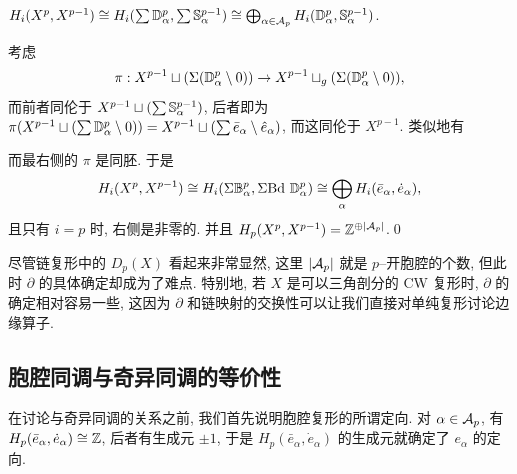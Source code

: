 \begin{Lemma}
	$ H_i(X^p,X^{p-1})\cong H_i(\sum\D_\alpha^p,\sum\S_\alpha^{p-1})\cong\bigoplus_{\alpha\in\CA_p}H_i(\D_\alpha^p,\S_\alpha^{p-1}) $.
\end{Lemma}
\begin{Proof}
	考虑
	\[
		\pi : X^{p-1}\sqcup(\Sigma(\D_\alpha^p\sm 0))\to X^{p-1}\sqcup_g(\Sigma(\D_\alpha^p\sm 0)),
	\]
	而前者同伦于 $ X^{p-1}\sqcup(\sum\S_\alpha^{p-1}) $, 后者即为 $ \pi(X^{p-1}\sqcup(\sum\D_\alpha^p\sm 0))=X^{p-1}\sqcup(\sum\bar{e}_\alpha\sm\hat{e}_\alpha) $, 而这同伦于 $ X^{p-1} $. 类似地有
	\begin{center}
	\end{center}
	而最右侧的 $ \pi $ 是同胚. 于是
	\[
		H_i(X^p,X^{p-1})\cong H_i(\Sigma\B_\alpha^p,\Sigma\Bd\,\D_\alpha^p)\cong\bigoplus_\alpha H_i(\bar{e}_\alpha,\dot{e}_\alpha),
	\]
	且只有 $ i=p $ 时, 右侧是非零的. 并且 $ H_p(X^p,X^{p-1})=\Z^{\oplus\abs{\CA_p}} $.\qed
\end{Proof}

尽管链复形中的 $ D_p(X) $ 看起来非常显然, 这里 $ \abs{\CA_p} $ 就是 $ p $--开胞腔的个数, 但此时 $ \partial $ 的具体确定却成为了难点. 特别地, 若 $ X $ 是可以三角剖分的 CW 复形时, $ \partial $ 的确定相对容易一些, 这因为 $ \partial $ 和链映射的交换性可以让我们直接对单纯复形讨论边缘算子.

\subsection{胞腔同调与奇异同调的等价性}

在讨论与奇异同调的关系之前, 我们首先说明胞腔复形的所谓定向. 对 $ \alpha\in\CA_p $, 有 $ H_p(\bar{e}_\alpha,\dot{e}_\alpha)\cong\Z $, 后者有生成元 $ \pm 1 $, 于是 $ H_p(\bar{e}_\alpha,\dot{e}_\alpha) $ 的生成元就确定了 $ e_\alpha $ 的定向.

